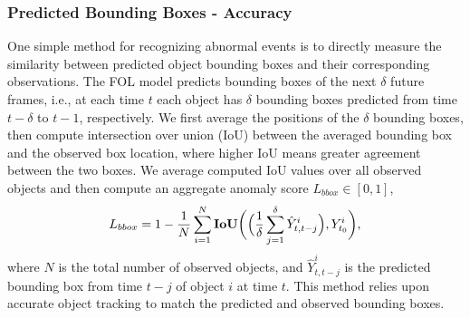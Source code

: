 \documentclass[letterpaper, 10 pt, conference]{ieeeconf}
\theoremstyle{definition}
\theoremstyle{remark}
\begin{document}
\subsubsection{Predicted Bounding Boxes - Accuracy}
\label{sec:metrics_one}
One simple method for recognizing abnormal
events is to directly measure the similarity between predicted
object bounding boxes and their corresponding observations.
The FOL model predicts bounding boxes
of the next $\delta$ future frames, i.e., at each time $t$ each object has $\delta$ bounding boxes
predicted from time $t-\delta$ to $t-1$, respectively.
We first average the positions of the $\delta$ bounding boxes,
then compute intersection over union (IoU) between the averaged bounding box and the observed box location,
where higher IoU means greater agreement between the two boxes.
We average computed IoU values over all observed
objects and then compute an aggregate anomaly score $L_{bbox}\in[0,1]$,
\begin{equation}\label{eq:l_bbox}
    L_{bbox} = 1 - \frac{1}{N}\sum_{i=1}^{N}
    \text{\textbf{IoU}}\bigg(\Big(\frac{1}{\delta}\sum_{j=1}^{\delta}\hat{Y}_{t, t-j}^{i}\Big), Y_{t_0}^{i}\bigg),
\end{equation}
where $N$ is the total number of observed objects, and $\hat{Y}_{t,t-j}^{i}$
is the predicted bounding box from time $t-j$ of object $i$ at time $t$.
This method relies upon accurate object tracking to match the predicted
and observed bounding boxes.
\end{document}
